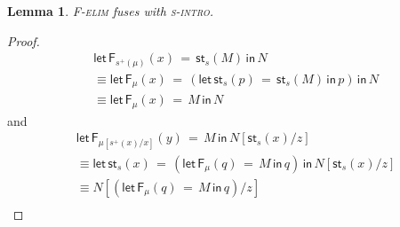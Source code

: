 \documentclass[10pt]{article}
\newtheorem{lemma}{Lemma}
\theoremstyle{definition}
\newcommand\StI[2]{\ensuremath{\mathsf{st}_{#1}(#2)}}
\newcommand\StE[4]{\ensuremath{\mathsf{let} \, \StI{#1}{#3} \, = \, {#2} \, \mathsf{in} \, #4}}
\newcommand\FEs[4]{\ensuremath{\mathsf{let} \, \mathsf{F}_{#1}(#3) \, = \, {#2} \, \mathsf{in} \, #4}}
\newcommand\TrPlus[2]{\ensuremath{{#1}^+(#2)}}
\begin{document}
\begin{lemma}
\textsc{F-elim} fuses with \textsc{s-intro}.
\end{lemma}
\begin{proof}
\begin{align*}
&\FEs{\TrPlus{s}{\mu}}{\StI{s}{M}}{x}{N} \\
&\equiv \FEs{\mu}{(\StE{s}{\StI{s}{M}}{p}{p})}{x}{N} \\
&\equiv \FEs{\mu}{M}{x}{N}
\end{align*}
and
\begin{align*}
& \FEs{\mu[\TrPlus{s}{x}/x]}{M}{y}{N[\StI{s}{x}/z]} \\
&\equiv \StE{s}{(\FEs{\mu}{M}{q}{q})}{x}{N[\StI{s}{x}/z]} \\
&\equiv N[(\FEs{\mu}{M}{q}{q})/z] \\
\end{align*}
\end{proof}
\end{document}
